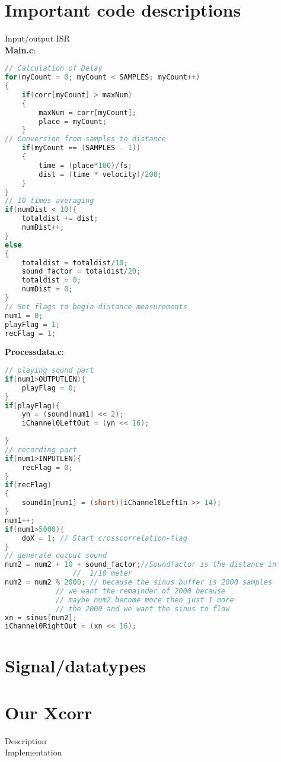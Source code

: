 \section{Important code descriptions}
Input/output ISR\\
\textbf{Main.c}:\\
\begin{lstlisting}[language=C]
// Calculation of Delay
for(myCount = 0; myCount < SAMPLES; myCount++)
{
	if(corr[myCount] > maxNum)
	{
		maxNum = corr[myCount];
		place = myCount;	
	}
// Conversion from samples to distance
	if(myCount == (SAMPLES - 1))
	{
		time = (place*100)/fs;
		dist = (time * velocity)/200;
	}
}
// 10 times averaging
if(numDist < 10){
	totaldist += dist;
	numDist++;
}
else
{
	totaldist = totaldist/10;
	sound_factor = totaldist/20;
	totaldist = 0;
	numDist = 0;
}
// Set flags to begin distance measurements
num1 = 0;
playFlag = 1;
recFlag = 1;
\end{lstlisting}


\textbf{Processdata.c}:\\
\begin{lstlisting}[language=C]
// playing sound part
if(num1>OUTPUTLEN){
	playFlag = 0;
}
if(playFlag){
	yn = (sound[num1] << 2);
	iChannel0LeftOut = (yn << 16);
		
}
// recording part
if(num1>INPUTLEN){
	recFlag = 0;
}
if(recFlag)
{
	soundIn[num1] = (short)(iChannel0LeftIn >> 14);
}
num1++;
if(num1>5000){
	doX = 1; // Start crosscorrelation-flag
}
// generate output sound
num2 = num2 + 10 + sound_factor;//Soundfactor is the distance in 
				//  1/10 meter
num2 = num2 % 2000;	// because the sinus buffer is 2000 samples
			// we want the remainder of 2000 because 
			// maybe num2 become more then just 1 more 
			// the 2000 and we want the sinus to flow
xn = sinus[num2];			
iChannel0RightOut = (xn << 16);
\end{lstlisting}
\section{Signal/datatypes}
\section{Our Xcorr}
Description\\
Implementation\\
